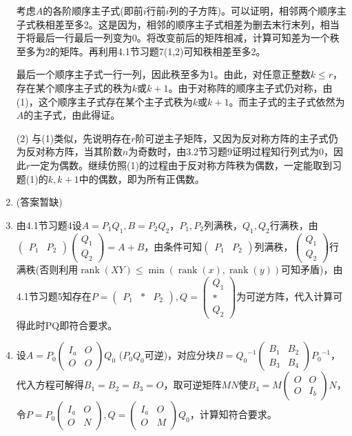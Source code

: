 \documentclass[a4paper,UTF8,fontset=windows]{ctexart}
\DeclareMathOperator{\rank}{rank}
\begin{document}
\begin{enumerate}
考虑$A$的各阶顺序主子式(即前$i$行前$i$列的子方阵)。可以证明，相邻两个顺序主子式秩相差至多2。这是因为，相邻的顺序主子式相差为删去末行末列，相当于将最后一行最后一列变为0。将改变前后的矩阵相减，计算可知差为一个秩至多为2的矩阵。再利用4.1节习题7(1,2)可知秩相差至多2。

最后一个顺序主子式一行一列，因此秩至多为1。由此，对任意正整数$k\le r$，存在某个顺序主子式的秩为$k$或$k+1$。由于对称阵的顺序主子式仍对称，由(1)，这个顺序主子式存在某个主子式秩为$k$或$k+1$。而主子式的主子式依然为$A$的主子式，由此得证。

(2) 与(1)类似，先说明存在$r$阶可逆主子矩阵，又因为反对称方阵的主子式仍为反对称方阵，当其阶数$n$为奇数时，由3.2节习题9证明过程知行列式为0，因此$r$一定为偶数。继续仿照(1)的过程由于反对称方阵秩为偶数，一定能取到习题(1)的$k,k+1$中的偶数，即为所有正偶数。

\item
(答案暂缺)

\item
由4.1节习题4设$A=P_1Q_1,B=P_2Q_2$，$P_1,P_2$列满秩，$Q_1,Q_2$行满秩，由$\begin{pmatrix}P_1&P_2\end{pmatrix}\begin{pmatrix}Q_1\\Q_2\end{pmatrix}=A+B$，由条件可知$\begin{pmatrix}P_1&P_2\end{pmatrix}$列满秩，$\begin{pmatrix}Q_1\\Q_2\end{pmatrix}$行满秩(否则利用$\rank(XY)\le\min(\rank(x),\rank(y))$可知矛盾)，由4.1节习题5知存在$P=\begin{pmatrix}P_1&\ast&P_2\end{pmatrix},Q=\begin{pmatrix}Q_1\\\ast\\Q_2\end{pmatrix}$为可逆方阵，代入计算可得此时PQ即符合要求。

\item
设$A=P_0\begin{pmatrix}I_a&O\\O&O\end{pmatrix}Q_0$ ($P_0Q_0$可逆)，对应分块$B={Q_0}^{-1}\begin{pmatrix}B_1&B_2\\B_3&B_4\end{pmatrix}{P_0}^{-1}$，代入方程可解得$B_1=B_2=B_3=O$，取可逆矩阵$MN$使$B_4=M\begin{pmatrix}O&O\\O&I_b\end{pmatrix}N$，令$P=P_0\begin{pmatrix}I_a&O\\O&N\end{pmatrix},Q=\begin{pmatrix}I_a&O\\O&M\end{pmatrix}Q_0$，计算知符合要求。


\end{enumerate}
\end{document}

